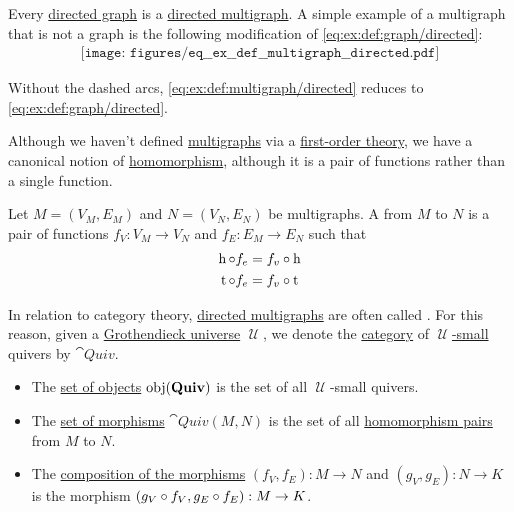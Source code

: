 \begin{example}\label{ex:def:multigraph}
  Every \hyperref[def:directed_graph]{directed graph} is a \hyperref[def:directed_multigraph]{directed multigraph}. A simple example of a multigraph that is not a graph is the following modification of \eqref{eq:ex:def:graph/directed}:
  \begin{equation}\label{eq:ex:def:multigraph/directed}
    \begin{aligned}
      \texttt{[image: figures/eq\_\_ex\_\_def\_\_multigraph\_\_directed.pdf]}
    \end{aligned}
  \end{equation}

  Without the dashed arcs, \eqref{eq:ex:def:multigraph/directed} reduces to \eqref{eq:ex:def:graph/directed}.
\end{example}

\begin{definition}\label{def:multigraph_homomorphism}
  Although we haven't defined \hyperref[def:multigraph]{multigraphs} via a \hyperref[def:first_order_theory]{first-order theory}, we have a canonical notion of \hyperref[def:first_order_homomorphism]{homomorphism}, although it is a pair of functions rather than a single function.

  Let \( M = (V_M, E_M) \) and \( N = (V_N, E_N) \) be multigraphs. A  from \( M \) to \( N \) is a pair of functions \( f_V: V_M \to V_N \) and \( f_E: E_M \to E_N \) such that
  \begin{align}
    \operatorname{h} \mathbin \circ f_e &= f_v \mathbin \circ \operatorname{h} \label{eq:def:multigraph_homomorphism/head} \\
    \operatorname{t} \mathbin \circ f_e &= f_v \mathbin \circ \operatorname{t} \label{eq:def:multigraph_homomorphism/tail}
  \end{align}
\end{definition}

\begin{definition}\label{def:category_of_qivers}
  In relation to category theory, \hyperref[def:multigraph/directed]{directed multigraphs} are often called . For this reason, given a \hyperref[def:grothendieck_universe]{Grothendieck universe} \( \mscrU \), we denote the \hyperref[def:category]{category} of \hyperref[def:large_and_small_sets]{\( \mscrU \)-small} quivers by \( \cat{Quiv} \).

  \begin{itemize}
    \item The \hyperref[def:category/C1]{set of objects} \( \operatorname{obj}(\operatorname{\mathbf{Quiv}}) \) is the set of all \( \mscrU \)-small quivers.
    \item The \hyperref[def:category/C2]{set of morphisms} \( \cat{Quiv}(M, N) \) is the set of all \hyperref[def:multigraph_homomorphism]{homomorphism pairs} from \( M \) to \( N \).

    \item The \hyperref[def:category/C3]{composition of the morphisms} \( (f_V, f_E): M \to N \) and \( (g_V, g_E): N \to K \) is the morphism \( (g_V \mathbin \circ f_V, g_E \mathbin \circ f_E): M \to K \).
  \end{itemize}
\end{definition}
